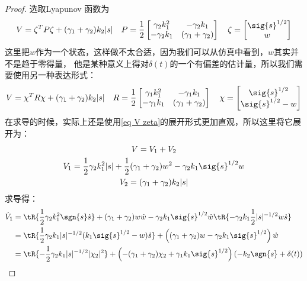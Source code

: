 \begin{proof}
	
	选取Lyapunov 函数为
	\begin{equation}
		\label{eq V zeta}
		V=\zeta^T P \zeta + (\gamma_1 +\gamma_2)k_2 |s|\quad 
		P=\frac12 \begin{bmatrix}
			\gamma_2 k_1^2  & -\gamma_2 k_1\\
			-\gamma_2 k_1 & (\gamma_1+\gamma_2)\\
		\end{bmatrix}
		\quad 
		\zeta =\begin{bmatrix}
			\sig{s}^{1/2}\\
			w
		\end{bmatrix}
	\end{equation}
	这里把$w$作为一个状态，这样做不太合适，因为我们可以从仿真中看到，$w$其实并不是趋于零得量，
	他是某种意义上得对$\delta(t)$的一个有偏差的估计量，所以我们需要使用另一种表达形式：
	\begin{equation}
		V=\chi^T R \chi + (\gamma_1 +\gamma_2)k_2 |s|\quad 
		R=\frac12 \begin{bmatrix}
			\gamma_1 k_1^2  & -\gamma_1 k_1\\
			-\gamma_1 k_1 & (\gamma_1+\gamma_2)\\
		\end{bmatrix}\quad 
		\chi=\begin{bmatrix}
			\sig{s}^{1/2}\\
			\sig{s}^{1/2}-w
		\end{bmatrix}
	\end{equation}
	在求导的时候，实际上还是使用\eqref{eq V zeta}的展开形式更加直观，所以这里将它展开为：
	\begin{gather*}
		V=V_1+V_2\\
		V_1=\frac12 \gamma_2 k_1^2 |s|
		+ \frac12(\gamma_1+\gamma_2) w^2
		-\gamma_2 k_1 \sig{s}^{1/2}w
		\\
		V_2=(\gamma_1+\gamma_2)k_2 |s|
	\end{gather*}
	求导得：
	\begin{align*}
		\dot{V}_1
		&=\tR{\frac12 \gamma_2 k_1^2 \sgn{s}\dot{s}}
		+(\gamma_1+\gamma_2) w \dot{w}
		-\gamma_2 k_1 \sig{s}^{1/2}\dot{w}
		\tR{-\gamma_2 k_1 \frac12 |s|^{-1/2}w\dot{s}}
		\\
		&=\tR{\frac12 \gamma_2 k_1 |s|^{-1/2} (k_1\sig{s}^{1/2}-w)\dot{s}}
		+\left((\gamma_1+\gamma_2) w -\gamma_2 k_1 \sig{s}^{1/2}\right)\dot{w}
		\\
		&=\tR{-\frac12 \gamma_2 k_1 |s|^{-1/2} |\chi_2|^2}
		+\left(-(\gamma_1+\gamma_2) \chi_2 +\gamma_1 k_1 \sig{s}^{1/2}\right)(-k_2\sgn{s}+\delta(t))

\end{align*}
\end{proof}
